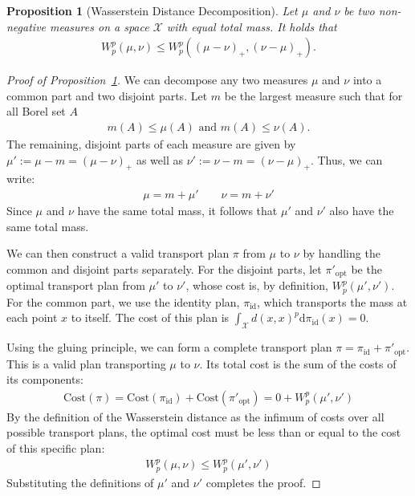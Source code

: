 \documentclass{article}
\theoremstyle{plain}
\newtheorem{prop}[thm]{Proposition}
\theoremstyle{definition}
\theoremstyle{remark}
\providecommand{\diff}{\mathrm{d}}
\begin{document}
\begin{prop}[Wasserstein Distance Decomposition]
\label{prop: wasserstein distance decomposition}
Let $\mu$ and $\nu$ be two non-negative measures on a space $\mathcal{X}$ with equal total mass. It holds that
\begin{align}
    W_p^p(\mu, \nu) \le W_p^p\left((\mu-\nu)_+, (\nu-\mu)_+\right).
\end{align}
\end{prop}
\begin{proof}[Proof of Proposition~\ref{prop: wasserstein distance decomposition}]
    We can decompose any two measures $\mu$ and $\nu$ into a common part and two disjoint parts. Let $m$ be the largest measure such that for all Borel set $A$
    \begin{align}
    m(A) \le \mu(A) \text{ and } m(A) \le \nu(A).
    \end{align}
    The remaining, disjoint parts of each measure are given by $\mu' := \mu - m = (\mu-\nu)_+$ as well as  $\nu' := \nu - m = (\nu-\mu)_+$. Thus, we can write:
    \begin{align}
        \mu = m + \mu' \qquad  \nu = m + \nu'
    \end{align}
    Since $\mu$ and $\nu$ have the same total mass, it follows that $\mu'$ and $\nu'$ also have the same total mass.

    We can then construct a valid transport plan $\pi$ from $\mu$ to $\nu$ by handling the common and disjoint parts separately.
    For the disjoint parts, let $\pi'_{\text{opt}}$ be the optimal transport plan from $\mu'$ to $\nu'$, whose cost is, by definition, $W_p^p(\mu', \nu')$.
    For the common part, we use the identity plan, $\pi_{\text{id}}$, which transports the mass at each point $x$ to itself. The cost of this plan is $\int_{\mathcal{X}} d(x,x)^p  \diff\pi_{\text{id}}(x) = 0$.

    Using the gluing principle, we can form a complete transport plan $\pi = \pi_{\text{id}} + \pi'_{\text{opt}}$. This is a valid plan transporting $\mu$ to $\nu$. Its total cost is the sum of the costs of its components:
    \begin{align}
        \text{Cost}(\pi) = \text{Cost}(\pi_{\text{id}}) + \text{Cost}(\pi'_{\text{opt}}) = 0 + W_p^p(\mu', \nu')
    \end{align}
    By the definition of the Wasserstein distance as the infimum of costs over all possible transport plans, the  optimal cost must be less than or equal to the cost of this specific plan:
    \begin{align}
        W_p^p(\mu, \nu) \le W_p^p(\mu', \nu')
    \end{align}
  Substituting the definitions of $\mu'$ and $\nu'$ completes the proof.
\end{proof}
\end{document}
